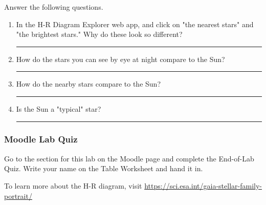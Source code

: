 \documentclass[main.tex]{subfiles}
\begin{document}
Answer the following questions.
\begin{enumerate}
\item In the H-R Diagram Explorer web app, and click on "the nearest stars" and "the brightest stars." Why do these look so different?

\rule{15cm}{.15mm}
\item How do the stars you can see by eye at night compare to the Sun?

\rule{15cm}{.15mm}
\item How do the nearby stars compare to the Sun?

\rule{15cm}{.15mm}
\item Is the Sun a "typical" star?

\rule{15cm}{.15mm}
\end{enumerate}

\subsubsection{Moodle Lab Quiz}
Go to the section for this lab on the Moodle page and complete the End-of-Lab Quiz. Write your name on the Table Worksheet and hand it in.

To learn more about the H-R diagram, visit \url{https://sci.esa.int/gaia-stellar-family-portrait/}
\end{document}
